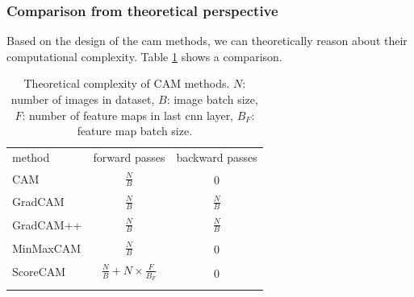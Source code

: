 \subsubsection{Comparison from theoretical perspective}
Based on the design of the \acrshort{cam} methods, we can theoretically reason about their computational complexity. Table \ref{tab:complexity_theoretical} shows a comparison.
\begin{table}[ht]
\centering
\begin{tabular}{lcc}
  \toprule
  method & forward passes & backward passes\\
  \cmidrule(lr){1-3}
  \addlinespace[0.5em]
  CAM & $\begin{aligned} \frac{N}{B} \end{aligned}$ & $\begin{aligned}0\end{aligned}$\\
  \addlinespace[0.5em]
  GradCAM   & $\begin{aligned} \frac{N}{B} \end{aligned}$ & $\begin{aligned} \frac{N}{B}\end{aligned}$\\
  \addlinespace[0.5em]
  GradCAM++ & $\begin{aligned} \frac{N}{B} \end{aligned}$ & $\begin{aligned} \frac{N}{B}\end{aligned}$\\
  \addlinespace[0.5em]
  MinMaxCAM & $\begin{aligned} \frac{N}{B} \end{aligned}$ & $\begin{aligned}0\end{aligned}$\\
  \addlinespace[0.5em]
  ScoreCAM &  $\begin{aligned} \frac{N}{B} + N \times \frac{F}{B_F} \end{aligned}$ & $\begin{aligned}0\end{aligned}$\\
  \addlinespace[0.5em]
  \bottomrule 
\end{tabular}
\caption[Theoretical complexity of CAM methods]{Theoretical complexity of CAM methods. $N$: number of images in dataset, $B$: image batch size, $F$: number of feature maps in last \acrshort{cnn} layer, $B_F$: feature map batch size.}
\label{tab:complexity_theoretical}
\end{table}

